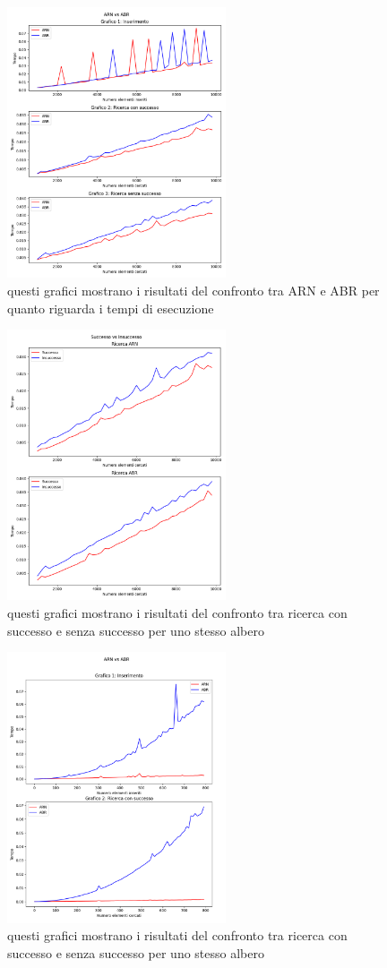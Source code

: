 \documentclass{article}
\begin{document}
\begin{figure}[hb]
    \centering
    \includegraphics[height=8cm]{grafici/insert_and_search_comparison.png}
    \caption{questi grafici mostrano i risultati del confronto tra ARN e ABR per quanto riguarda i tempi di esecuzione }
    \label{fig:1}
\end{figure}
\begin{figure}[h]
    \centering
    \includegraphics[height= 8cm]{grafici/sux_vs_notsux_comparison.png}
    \caption{questi grafici mostrano i risultati del confronto tra ricerca con successo e senza successo per uno stesso albero}
    \label{fig:2}
\end{figure}
\begin{figure}[h]
    \centering
    \includegraphics[height= 8cm]{grafici/ordered_insert_and_search_comparison.png}
    \caption{questi grafici mostrano i risultati del confronto tra ricerca con successo e senza successo per uno stesso albero}
    \label{fig:3}
\end{figure}
\end{document}
